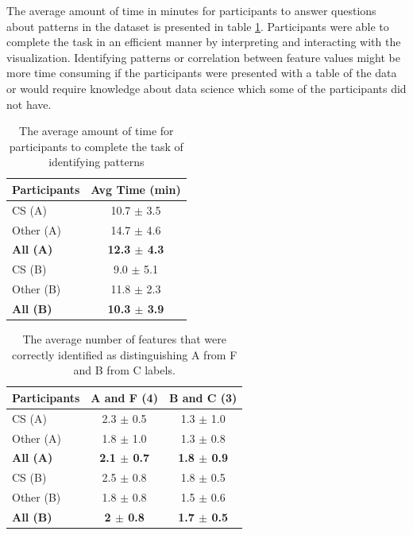 The average amount of time in minutes for participants to answer questions about patterns in the dataset is presented in table \ref{AvgTimeIdentifyPattern}. Participants were able to complete the task in an efficient manner by interpreting and interacting with the visualization. Identifying patterns or correlation between feature values might be more time consuming if the participants were presented with a table of the data or would require knowledge about data science which some of the participants did not have.

\begin{table}[]
\centering
\begin{tabular}{lc}
\hline
Participants & Avg Time (min) \\ \hline
CS (A)         &    10.7  $\pm$ 3.5        \\
Other (A)        &  14.7 $\pm$ 4.6           \\
\textbf{All (A)} & \textbf{12.3 $\pm$ 4.3}    \\ \hline
CS (B)         &    9.0 $\pm$ 5.1        \\
Other (B)        &  11.8  $\pm$ 2.3          \\
\textbf{All (B)} & \textbf{10.3 $\pm$ 3.9}   \\ \hline
\end{tabular}
\caption{The average amount of time for participants to complete the task of identifying patterns}
\label{AvgTimeIdentifyPattern}
\end{table}

\begin{table}[]
\centering
\begin{tabular}{lcc}
\hline
Participants & A and F (4) & B and C (3)\\ \hline
CS (A)       & 2.3 $\pm$ 0.5     & 1.3 $\pm$ 1.0        \\
Other (A)    & 1.8 $\pm$ 1.0      & 1.3  $\pm$ 0.8     \\
\textbf{All (A)} & \textbf{2.1 $\pm$ 0.7}        &  \textbf{1.8 $\pm$ 0.9}       \\ \hline
CS (B)       & 2.5 $\pm$ 0.8      &  1.8 $\pm$ 0.5       \\
Other (B)    & 1.8 $\pm$ 0.8     & 1.5 $\pm$ 0.6      \\
\textbf{All (B)} &   \textbf{2 $\pm$ 0.8} & \textbf{1.7 $\pm$ 0.5}        \\ \hline
\end{tabular}
\caption{The average number of features that were correctly identified as distinguishing A from F and B from C labels.}
\label{DistinguishingFeatures}
\end{table}

